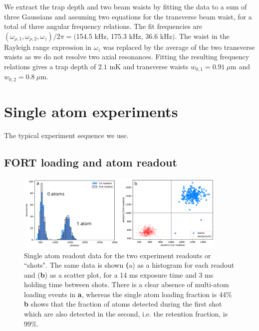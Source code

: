 We extract the trap depth and two beam waists by fitting the data to a sum of three Gaussians and assuming two equations for the transverse beam waist, for a total of three angular frequency relations. The fit frequencies are $(\omega_{\rho,1}, \omega_{\rho,2}, \omega_{z})/2\pi=($154.5 kHz, 175.3 kHz, 36.6 kHz$)$. The waist in the Rayleigh range expression in $\omega_z$ was replaced by the average of the two transverse waists as we do not resolve two axial resonances. Fitting the resulting frequency relations gives a trap depth of $2.1$ mK and transverse waists $w_{0,1}=0.91 ~\mu$m and $w_{0,2}=0.8 ~\mu$m.

\section{Single atom experiments}\label{sec:singleatomexperiments}
The typical experiment sequence we use. 

\subsection{FORT loading and atom readout}\label{sec:fort_loading}


\begin{figure}[!ht]
    \centering
    \includegraphics[width=0.9\textwidth]{Images/atom_histogram_and_scatterplot.pdf}
    \caption{Single atom readout data for the two experiment readouts or ``shots". The same data is shown \textbf({a}) as a histogram for each readout and (\textbf{b}) as a scatter plot, for a 14 ms exposure time and 3 ms holding time between shots. There is a clear absence of multi-atom loading events in \textbf{a}, whereas the single atom loading fraction is 44$\%$ \textbf{b} shows that the fraction of atoms detected during the first shot which are also detected in the second, i.e. the retention fraction, is $99\%$.}
    \label{fig:atom_histogram}
\end{figure}


